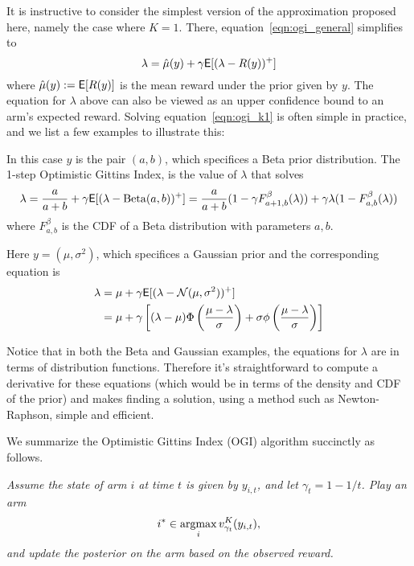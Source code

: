It is instructive to consider the simplest version of the approximation proposed here, namely the case where $K=1$. There, equation~\eqref{eqn:ogi_general} simplifies to
\begin{equation} \label{eqn:ogi_k1}
\lambda = \hat \mu(y) + \gamma \mathsf{E}[(\lambda - R(y))^+]
\end{equation}
where $\hat \mu(y) := \mathsf{E}[R(y)]$ is the mean reward under the prior given by $y$. The equation for $\lambda$ above can also be viewed as an upper confidence bound to an arm's expected reward. Solving equation~\eqref{eqn:ogi_k1} is often simple in practice, and we list a few examples to illustrate this:
\begin{example}[Beta]
	In this case $y$ is the pair $(a,b)$, which specifices a Beta prior distribution. The 1-step Optimistic Gittins Index, is the value of $\lambda$ that solves
	\begin{align*}
	\lambda = \frac{a}{a+b} + \gamma \mathsf{E}[(\lambda - {\rm Beta}(a,b))^+] =  \frac{a}{a+b}(1 - \gamma F^\beta_{a+1,b}(\lambda)) + \gamma \lambda (1-F^\beta_{a,b}(\lambda))
	\end{align*}
	where $F^\beta_{a,b}$ is the CDF of a Beta distribution with parameters $a, b$.
\end{example}

\begin{example}[Gaussian]
	Here $y = (\mu,\sigma^2)$, which specifices a Gaussian prior and the corresponding equation is
	\begin{align*}
	\lambda & = \mu  + \gamma \mathsf{E}[(\lambda - {\rm \mathcal{N}}(\mu,\sigma^2))^+]  \\
	& = \mu + \gamma \left[( \lambda - \mu) \Phi\left(\frac{\mu - \lambda}{\sigma}\right) + \sigma\phi\left(\frac{\mu-\lambda}{\sigma}\right) \right]
	\end{align*}
\end{example}

Notice that in both the Beta and Gaussian examples, the equations for $\lambda$ are in terms of distribution functions. Therefore it's straightforward to compute a derivative for these equations (which would be in terms of the density and CDF of the prior) and makes finding a solution, using a method such as Newton-Raphson, simple and efficient.

We summarize the Optimistic Gittins Index (OGI) algorithm succinctly as follows. 

{\em Assume the state of arm $i$ at time $t$ is given by $y_{i,t}$, and let $\gamma_t = 1-1/t$. Play an arm 
	$$i^* \in \operatorname*{\mathrm{argmax}}_i v^K_{\gamma_t}(y_{i,t}),$$ 
	and update the posterior on the arm based on the observed reward.}